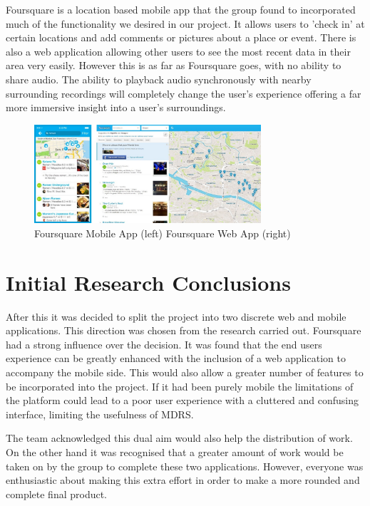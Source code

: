 \documentclass{l3proj}
\begin{document}
Foursquare\cite{foursquare} is a location based mobile app that the group found to incorporated much of the functionality we desired in our project. It allows users to 'check in' at certain locations and add comments or pictures about a place or event. There is also a web application allowing other users to see the most recent data in their area very easily. However this is as far as Foursquare goes, with no ability to share audio. The ability to playback audio synchronously with nearby surrounding recordings will completely change the user's experience offering a far more immersive insight into a user's surroundings.

\begin{figure}[ht!]
  \centering
\includegraphics[width=0.75\textwidth]{images/foursquare.jpg}
\caption{Foursquare Mobile App (left) Foursquare Web App (right)}
\end{figure}

\section{Initial Research Conclusions}

After this it was decided to split the project into two discrete web and mobile applications. This direction was chosen from the research carried out. Foursquare had a strong influence over the decision. It was found that the end users experience can be greatly enhanced with the inclusion of a web application to accompany the mobile side. This would also allow a greater number of features to be incorporated into the project. If it had been purely mobile the limitations of the platform could lead to a poor user experience with a cluttered and confusing interface, limiting the usefulness of MDRS.

The team acknowledged this dual aim would also help the distribution of work. On the other hand it was recognised that a greater amount of work would be taken on by the group to complete these two applications. However, everyone was enthusiastic about making this extra effort in order to make a more rounded and complete final product.
\end{document}

